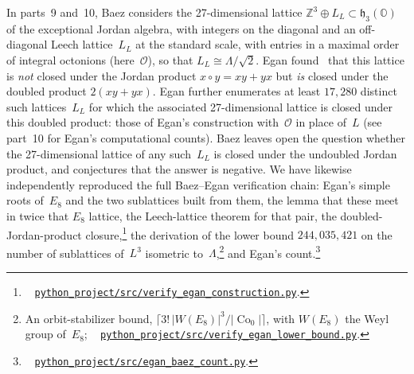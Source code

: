 \documentclass[twoside,english]{paper}
\numberwithin{equation}{section}
\numberwithin{figure}{section}
\theoremstyle{definition}
\theoremstyle{remark}
\newcommand{\OO}{\mathbb{O}}          %
\newcommand{\MO}{\mathcal{O}}         %
\newcommand{\ZZ}{\mathbb{Z}}
\newcommand{\LL}{\Lambda}             %
\DeclareMathOperator{\Co}{Co}
\newcommand{\scriptref}[1]{\cite{repo}~%
  \href{https://github.com/koeplinger/leech\_alg/blob/main/python\_project/src/#1}%
  {\nolinkurl{python_project/src/#1}}}
\begin{document}
In parts~9 and~10, Baez considers the 27-dimensional lattice
$\ZZ^3 \oplus L_L \subset \mathfrak{h}_3(\OO)$ of the exceptional Jordan
algebra, with integers on the diagonal and an off-diagonal Leech
lattice~$L_L$ at the standard scale, with entries in a maximal order of
integral octonions (here~$\MO$), so that $L_L \cong \LL/\sqrt{2}$.  Egan found~\cite{Egan2014} that this lattice
is \emph{not} closed under the Jordan product $x \circ y = xy + yx$ but
\emph{is} closed under the doubled product $2(xy + yx)$.  Egan further
enumerates at least $17{,}280$ distinct such lattices~$L_L$ for which
the associated 27-dimensional lattice is closed under this doubled
product: those of Egan's construction with~$\MO$ in place of~$L$ (see
part~10 for Egan's computational counts).  Baez leaves open the question
whether the 27-dimensional lattice of any such~$L_L$ is closed under the
undoubled Jordan product, and conjectures that the answer is negative.  We have likewise independently reproduced the full
Baez--Egan verification chain: Egan's simple roots of~$E_8$ and the two
sublattices built from them, the lemma that these meet in twice that
$E_8$ lattice, the Leech-lattice theorem for that pair, the
doubled-Jordan-product closure,\footnote{\scriptref{verify\_egan\_construction.py}.}
the derivation of the lower bound $244{,}035{,}421$ on the number of
sublattices of~$L^3$ isometric to~$\LL$,\footnote{An orbit-stabilizer bound, $\lceil 3!\,\lvert W(E_8)\rvert^3 / \lvert\Co_0\rvert\rceil$, with $W(E_8)$ the Weyl group of~$E_8$;
\scriptref{verify\_egan\_lower\_bound.py}.} and Egan's
count.\footnote{\scriptref{egan\_baez\_count.py}.}
\end{document}
